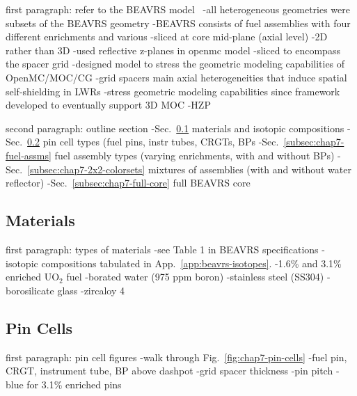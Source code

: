 first paragraph: refer to the \ac{BEAVRS} model~\cite{horelik2013beavrs}
-all heterogeneous geometries were subsets of the \ac{BEAVRS} geometry
-\ac{BEAVRS} consists of fuel assemblies with four different enrichments and various
-sliced at core mid-plane (axial level)
-2D rather than 3D
  -used reflective z-planes in openmc model
  -sliced to encompass the spacer grid
    -designed model to stress the geometric modeling capabilities of OpenMC/MOC/CG
    -grid spacers main axial heterogeneities that induce spatial self-shielding in \ac{LWR}s
    -stress geometric modeling capabilities since framework developed to eventually support 3D \ac{MOC}
-HZP

second paragraph: outline section
-Sec.~\ref{subsec:chap7-materials} materials and isotopic compositions
-Sec.~\ref{subsec:chap7-pin-cells} pin cell types (fuel pins, instr tubes, \ac{CRGT}s, \ac{BP}s
-Sec.~\ref{subsec:chap7-fuel-assms} fuel assembly types (varying enrichments, with and without \ac{BP}s)
-Sec.~\ref{subsec:chap7-2x2-colorsets} mixtures of assemblies (with and without water reflector)
-Sec.~\ref{subsec:chap7-full-core} full \ac{BEAVRS} core

\subsection{Materials}
\label{subsec:chap7-materials}

first paragraph: types of materials
-see Table 1 in BEAVRS specifications
-isotopic compositions tabulated in App.~\ref{app:beavrs-isotopes}.
-1.6\% and 3.1\% enriched UO$_2$ fuel
-borated water (975 ppm boron)
-stainless steel (SS304)
-borosilicate glass
-zircaloy 4

\subsection{Pin Cells}
\label{subsec:chap7-pin-cells}

first paragraph: pin cell figures
-walk through Fig.~\ref{fig:chap7-pin-cells}
-fuel pin, \ac{CRGT}, instrument tube, \ac{BP} above dashpot
-grid spacer thickness
-pin pitch
-blue for 3.1\% enriched pins


